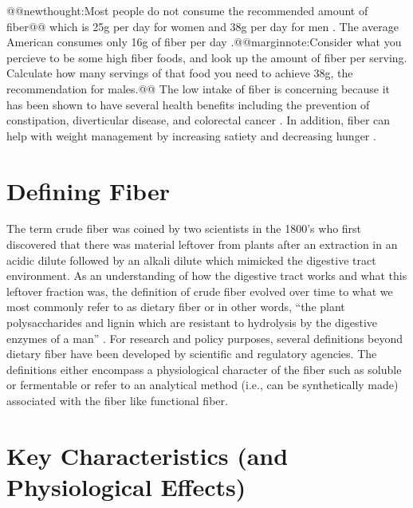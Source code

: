 \documentclass{tufte-handout}
\makeatletter
\def\newthought#1{@@newthought:#1@@}
\def\marginnote#1{@@marginnote:#1@@}
\makeatother
\begin{document}
\newthought{Most people do not consume the recommended amount of fiber} which is 25g per day for women and 38g per day for men \citep{InstituteofMedicine2005}. The average American consumes only 16g of fiber per day \citep{hoyFiberIntakeUS2010}.\marginnote{Consider what you percieve to be some high fiber foods, and look up the amount of fiber per serving.  Calculate how many servings of that food you need to achieve 38g, the recommendation for males.} The low intake of fiber is concerning because it has been shown to have several health benefits including the prevention of constipation, diverticular disease, and colorectal cancer \citep{slavinFiberPrebioticsMechanisms2013}. In addition, fiber can help with weight management by increasing satiety and decreasing hunger \citep{clarkEffectFiberSatiety2013}.

\section*{Defining Fiber}
The term crude fiber was coined by two scientists in the 1800's who first discovered that there was material leftover from plants after an extraction in an acidic dilute followed by an alkali dilute which mimicked the digestive tract environment. As an understanding of how the digestive tract works and what this leftover fraction was, the definition of crude fiber evolved over time to what we most commonly refer to as dietary fiber or in other words, ``the plant polysaccharides and lignin which are resistant to hydrolysis by the digestive enzymes of a man'' \citep{Trowell1978}. For research and policy purposes, several definitions beyond dietary fiber have been developed by scientific and regulatory agencies. The definitions either encompass a physiological character of the fiber such as soluble or fermentable or refer to an analytical method (i.e., can be synthetically made) associated with the fiber like functional fiber.

\section{Key Characteristics (and Physiological Effects)}
\end{document}
